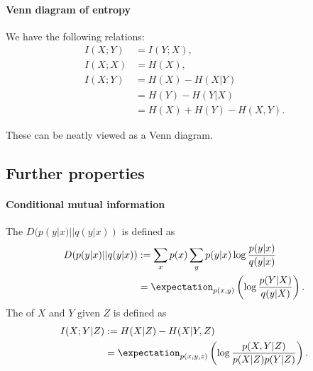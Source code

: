 \documentclass[a4paper, 11pt, openany]{book}
\begin{document}
\paragraph{Venn diagram of entropy}
We have the following relations:
\begin{align*}
	I(X;Y) &= I(Y;X),\\
	I(X;X) &= H(X),\\
	I(X;Y) &= H(X) - H(X|Y)\\
	&= H(Y) - H(Y|X)\\
	&= H(X) + H(Y) - H(X,Y).
\end{align*}

These can be neatly viewed as a Venn diagram.


\begin{center}
\end{center}






\subsection{Further properties}


\paragraph{Conditional mutual information}

The  $D(p(y|x) || q(y|x))$ is defined as
\begin{align*}
	D(p(y|x) || q(y|x)) &:= \sum_x p(x) \sum_y p(y|x) \log \frac{p(y|x)}{q(y|x)}\\
	&= \expectation_{p(x,y)} \left( \log \frac{p(Y|X)}{q(y|X)} \right).
\end{align*}
The  of $X$ and $Y$ given $Z$ is defined as
\begin{align*}
	I(X;Y|Z) &:= H(X|Z) - H(X|Y,Z)\\
	&= \expectation_{p(x,y,z)} \left( \log \frac{p(X,Y|Z)}{p(X|Z)p(Y|Z)} \right).
\end{align*}
\end{document}
